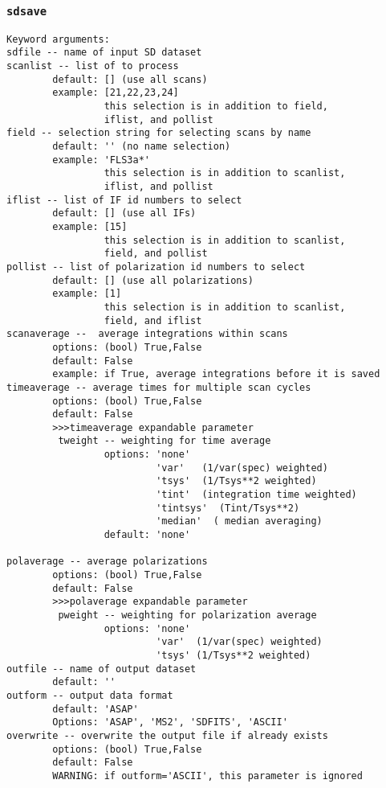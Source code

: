 \subsubsection{{\tt sdsave}}
\label{section:sd.sdtasks.tasks.sdsave}

\begin{verbatim}
Keyword arguments:
sdfile -- name of input SD dataset
scanlist -- list of to process
        default: [] (use all scans)
        example: [21,22,23,24]
                 this selection is in addition to field,
                 iflist, and pollist
field -- selection string for selecting scans by name
        default: '' (no name selection)
        example: 'FLS3a*'
                 this selection is in addition to scanlist,
                 iflist, and pollist
iflist -- list of IF id numbers to select
        default: [] (use all IFs)
        example: [15]
                 this selection is in addition to scanlist,
                 field, and pollist
pollist -- list of polarization id numbers to select
        default: [] (use all polarizations)
        example: [1]
                 this selection is in addition to scanlist,
                 field, and iflist
scanaverage --  average integrations within scans
        options: (bool) True,False
        default: False
        example: if True, average integrations before it is saved
timeaverage -- average times for multiple scan cycles
        options: (bool) True,False
        default: False
        >>>timeaverage expandable parameter
         tweight -- weighting for time average
                 options: 'none'
                          'var'   (1/var(spec) weighted)
                          'tsys'  (1/Tsys**2 weighted)
                          'tint'  (integration time weighted)
                          'tintsys'  (Tint/Tsys**2)
                          'median'  ( median averaging)
                 default: 'none'

polaverage -- average polarizations
        options: (bool) True,False
        default: False
        >>>polaverage expandable parameter
         pweight -- weighting for polarization average
                 options: 'none'
                          'var'  (1/var(spec) weighted)
                          'tsys' (1/Tsys**2 weighted)
outfile -- name of output dataset
        default: ''
outform -- output data format
        default: 'ASAP'
        Options: 'ASAP', 'MS2', 'SDFITS', 'ASCII'
overwrite -- overwrite the output file if already exists
        options: (bool) True,False
        default: False
        WARNING: if outform='ASCII', this parameter is ignored
\end{verbatim}

